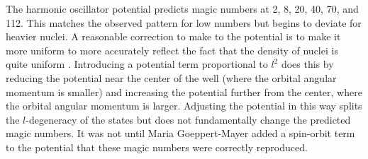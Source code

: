 The harmonic oscillator potential predicts magic numbers at 2, 8, 20, 40, 70, and 112.  This matches the observed pattern for low numbers but begins to deviate for heavier nuclei.  A reasonable correction to make to the potential is to make it more uniform to more accurately reflect the fact that the density of nuclei is quite uniform \citep{Casten}.  Introducing a potential term proportional to $l^2$ does this by reducing the potential near the center of the well (where the orbital angular momentum is smaller) and increasing the potential further from the center, where the orbital angular momentum is larger.  Adjusting the potential in this way splits the $l$-degeneracy of the states but does not fundamentally change the predicted magic numbers.  It was not until Maria Goeppert-Mayer added a spin-orbit term to the potential \citep{MGM} that these magic numbers were correctly reproduced.  

